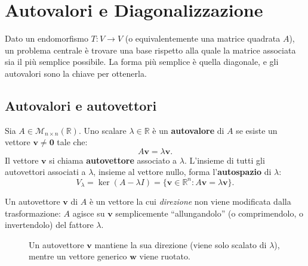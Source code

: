 \chapter[Autovalori]{Autovalori e Diagonalizzazione}
\label{ch:autovalori}

Dato un endomorfismo $T \colon V \to V$ (o equivalentemente una matrice quadrata $A$), un problema centrale è trovare una base rispetto alla quale la matrice associata sia il più semplice possibile. La forma più semplice è quella diagonale, e gli autovalori sono la chiave per ottenerla.

\section{Autovalori e autovettori}
\label{sec:autovalori-def}

\begin{definitionbox}
Sia $A \in \mathcal{M}_{n \times n}(\mathbb{R})$. Uno scalare $\lambda \in \mathbb{R}$ è un \textbf{autovalore} di $A$ se esiste un vettore $\mathbf{v} \neq \mathbf{0}$ tale che:
\[ A\mathbf{v} = \lambda\mathbf{v}. \]
Il vettore $\mathbf{v}$ si chiama \textbf{autovettore} associato a $\lambda$. L'insieme di tutti gli autovettori associati a $\lambda$, insieme al vettore nullo, forma l'\textbf{autospazio} di $\lambda$:
\[ V_\lambda = \ker(A - \lambda I) = \{\mathbf{v} \in \mathbb{R}^n : A\mathbf{v} = \lambda\mathbf{v}\}. \]
\end{definitionbox}

\begin{notebox}
Un autovettore $\mathbf{v}$ di $A$ è un vettore la cui \emph{direzione} non viene modificata dalla trasformazione: $A$ agisce su $\mathbf{v}$ semplicemente ``allungandolo'' (o comprimendolo, o invertendolo) del fattore $\lambda$.
\end{notebox}

\begin{figure}[htbp]
\centering
{}
\caption{Un autovettore $\mathbf{v}$ mantiene la sua direzione (viene solo scalato di $\lambda$), mentre un vettore generico $\mathbf{w}$ viene ruotato.}
\label{fig:autovettore}
\end{figure}


